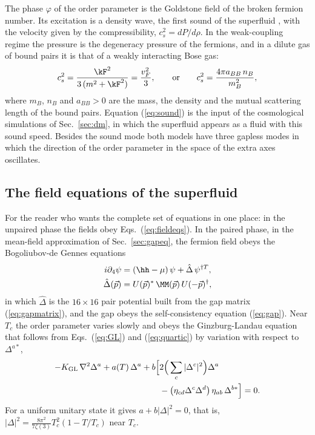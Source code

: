 The phase $\varphi$ of the order parameter is the Goldstone field of the broken fermion number. Its
excitation is a density wave, the first sound of the superfluid
\cite{Bogoliubov1947,Anderson1958}, with the velocity given by the compressibility,
$c_s^2=dP/d\rho$. In the weak-coupling regime the pressure is the degeneracy pressure of the fermions,
and in a dilute gas of bound pairs it is that of a weakly interacting Bose gas:
\begin{equation}
c_s^2=\frac{\kF^2}{3\,(m^2+\kF^2)}=\frac{v_F^2}{3},\qquad\text{or}\qquad c_s^2=\frac{4\pi a_{BB}\,n_B}{m_B^2},
\label{eq:sound}
\end{equation}
where $m_B$, $n_B$ and $a_{BB}>0$ are the mass, the density and the mutual scattering length of the
bound pairs. Equation (\ref{eq:sound}) is the input of the cosmological simulations of
Sec.~\ref{sec:dm}, in which the superfluid appears as a fluid with this sound speed. Besides the
sound mode both models have three gapless modes in which the direction of the order parameter in the
space of the extra axes oscillates. 

\subsection{The field equations of the superfluid}
\label{sec:sfeqs}

For the reader who wants the complete set of equations in one place: in the unpaired phase the fields
obey Eqs.~(\ref{eq:fieldeqs}). In the paired phase, in the mean-field approximation of
Sec.~\ref{sec:gapeq}, the fermion field obeys the Bogoliubov-de Gennes equations
\begin{align}
i\partial_4\psi&=(\hh-\mu)\,\psi+\hat\Delta\,\psi^{\dagger T},\nonumber\\
\hat\Delta(\vec p)&=U(\vec p)^{*}\,\MM(\vec p)\,U(-\vec p)^{\dagger},
\label{eq:BdG}
\end{align}
in which $\hat\Delta$ is the $16\times16$ pair potential built from the gap matrix
(\ref{eq:gapmatrix}), and the gap obeys the self-consistency equation (\ref{eq:gap}). Near $T_c$ the
order parameter varies slowly and obeys the Ginzburg-Landau equation that follows from
Eqs.~(\ref{eq:GL}) and (\ref{eq:quartic}) by variation with respect to $\Delta^{a*}$,
\begin{align}
-K_{\rm GL}\,\nabla^2\Delta^a+a(T)\,\Delta^a+b\Big[&2\Big(\sum_c|\Delta^c|^2\Big)\Delta^a\nonumber\\
&-\big(\eta_{cd}\Delta^c\Delta^d\big)\,\eta_{ab}\,\Delta^{b*}\Big]=0 .
\label{eq:GLeq}
\end{align}
For a uniform unitary state it gives $a+b|\Delta|^2=0$, that is,
$|\Delta|^2=\frac{8\pi^2}{7\zeta(3)}T_c^2(1-T/T_c)$ near $T_c$.

